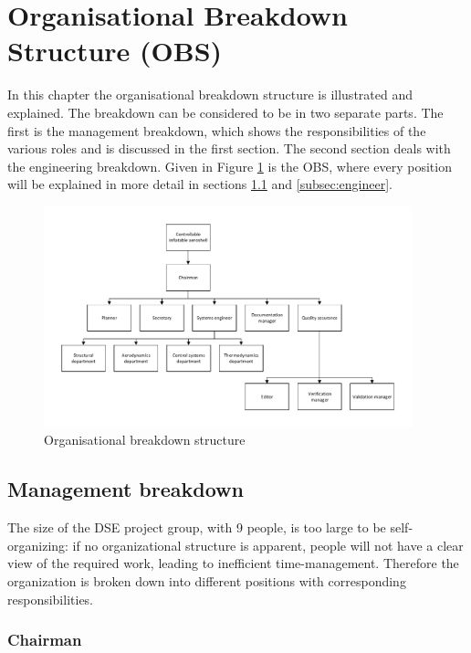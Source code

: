 \section{Organisational Breakdown Structure (OBS)}\label{cha:OBS}
In this chapter the organisational breakdown structure is illustrated and explained. The breakdown can be considered to be in two separate parts. The first is the management breakdown, which shows the responsibilities of the various roles and is discussed in the first section. The second section deals with the engineering breakdown. Given in Figure \ref{fig:OBS} is the OBS, where every position will be explained in more detail in sections \ref{subsec:management} and \ref{subsec:engineer}.

\begin{figure}[h]
\centering
\includegraphics[width=0.95\textwidth]{./Figure/OBS.pdf}
\caption{Organisational breakdown structure} \label{fig:OBS}
\end{figure}

\subsection{Management breakdown}\label{subsec:management}
The size of the DSE project group, with 9 people, is too large to be self-organizing: if no organizational structure is apparent, people will not have a clear view of the required work, leading to inefficient time-management. Therefore the organization is broken down into different positions with corresponding responsibilities.


\subsubsection{Chairman}\label{subsec:Chairman}


